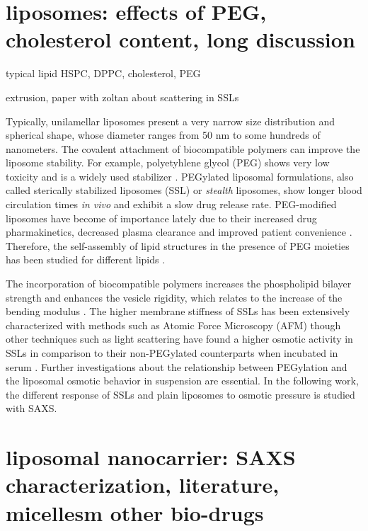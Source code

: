 \section{liposomes: effects of PEG, cholesterol content, long discussion}

typical lipid HSPC, DPPC, cholesterol, PEG

extrusion, paper with zoltan about scattering in SSLs

Typically, unilamellar liposomes present a very narrow size distribution and spherical shape, whose diameter ranges from 50 nm to some hundreds of nanometers. The covalent attachment of biocompatible polymers can improve the liposome stability. For example, polyetyhlene glycol (PEG) shows very low toxicity \citep{yamaoka_distribution_1994} and is a widely used stabilizer \citep{sou_polyethylene_2000}. PEGylated liposomal formulations, also called sterically stabilized liposomes (SSL) or \emph{stealth} liposomes, show longer blood circulation times \emph{in vivo} \citep{barenholz_liposome_2001} and exhibit a slow drug release rate. PEG-modified liposomes have become of importance lately due to their increased drug pharmakinetics, decreased plasma clearance and improved patient convenience \citep{gabizon_polyethylene_1997,harris_effect_2003}. Therefore, the self-assembly of lipid structures in the presence of PEG moieties has been studied for different lipids \citep{lee_coarse-grained_2011}.

The incorporation of biocompatible polymers increases the phospholipid bilayer strength and enhances the vesicle rigidity, which relates to the increase of the bending modulus \citep{liang_effect_2005, sou_polyethylene_2000}. The higher membrane stiffness of SSLs has been extensively characterized with methods such as Atomic Force Microscopy (AFM) \citep{spyratou_atomic_2009} though other techniques such as light scattering have found a higher osmotic activity in SSLs in comparison to their non-PEGylated counterparts when incubated in serum \citep{wolfram_shrinkage_2014}. Further investigations about the relationship between PEGylation and the liposomal osmotic behavior in suspension are essential. In the following work, the different response of SSLs and plain liposomes to osmotic pressure is studied with SAXS. 

\section{liposomal nanocarrier: SAXS characterization, literature, micellesm other bio-drugs}

